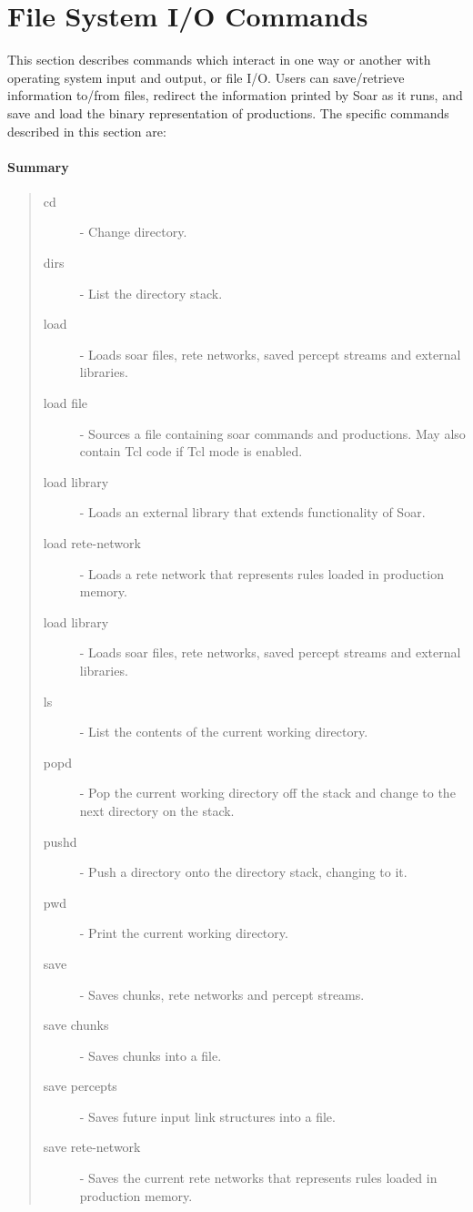 \divider 

\divider 

\divider 

\divider 

\divider 

\divider 

\divider 

\divider 


\section{File System I/O Commands}
\label{FILE-IO}

This section describes commands which interact in one way or another
with operating system input and output, or file I/O.  Users can
save/retrieve information to/from files, redirect the information
printed by Soar as it runs, and save and load the binary representation
of productions.
The specific commands described in this section are:

\paragraph{Summary}
\begin{quote}
\begin{description}
\item[cd] - Change directory.
\item[dirs] - List the directory stack.
\item[load] - Loads soar files, rete networks, saved percept streams and external libraries.
\item[load file] - Sources a file containing soar commands and productions.  May also contain Tcl code if Tcl mode is enabled.
\item[load library] - Loads an external library that extends functionality of Soar.
\item[load rete-network] - Loads a rete network that represents rules loaded in production memory.
\item[load library] - Loads soar files, rete networks, saved percept streams and external libraries.
\item[ls] - List the contents of the current working directory.
\item[popd] - Pop the current working directory off the stack and change to the next directory on the stack.
\item[pushd] - Push a directory onto the directory stack, changing to it.
\item[pwd] - Print the current working directory.
\item[save] - Saves chunks, rete networks and percept streams.
\item[save chunks] - Saves chunks into a file.
\item[save percepts] - Saves future input link structures into a file.
\item[save rete-network] - Saves the current rete networks that represents rules loaded in production memory.
\end{description}
\end{quote}

